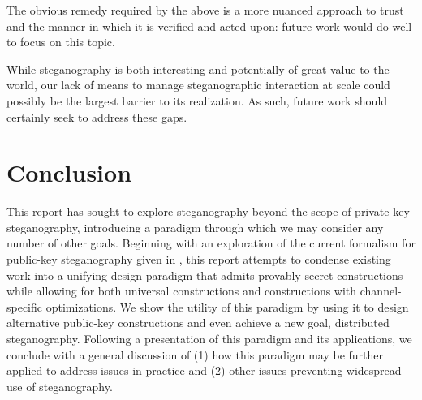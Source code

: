 \documentclass{article}
\begin{document}
\noindent The obvious remedy required by the above is a more nuanced approach 
to trust and the manner in which it is verified and acted upon: future work would 
do well to focus on this topic.

While steganography is both interesting and potentially of great value to the world, 
our lack of means to manage steganographic interaction at scale could possibly 
be the largest barrier to its realization.  As such, future work should 
certainly seek to address these gaps.

\section{Conclusion}

This report has sought to explore steganography beyond the scope of private-key steganography, 
introducing a paradigm through which we may consider any number of other goals.  Beginning with an exploration of the 
current formalism for public-key steganography given in \cite{BiglouPubKey}, this report attempts to 
condense existing work into a unifying design paradigm that admits provably secret constructions while 
allowing for both universal constructions and constructions with channel-specific optimizations.  We 
show the utility of this paradigm by using it to design alternative public-key constructions 
and even achieve a new goal, distributed steganography.  Following a presentation of this 
paradigm and its applications, we conclude with a general discussion of (1) how this paradigm 
may be further applied to address issues in practice and (2) other issues preventing widespread 
use of steganography.






\end{document}
